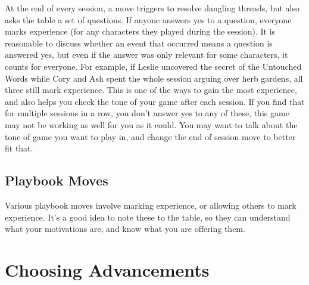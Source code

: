 \documentclass[
  oneside,
  statementpaper,
  9pt]{memoir}
\begin{document}
\begin{Player}

At the end of every session, a move triggers to resolve dangling threads, but also asks the table a set of questions. If anyone answers yes to a question, everyone marks experience (for any characters they played during the session). It is reasonable to discuss whether an event that occurred means a question is answered yes, but even if the answer was only relevant for some characters, it counts for everyone. For example, if Leslie uncovered the secret of the Untouched Words while Cory and Ash spent the whole session arguing over herb gardens, all three still mark experience. This is one of the ways to gain the most experience, and also helps you check the tone of your game after each session. If you find that for multiple sessions in a row, you don't answer yes to any of these, this game may not be working as well for you as it could. You may want to talk about the tone of game you want to play in, and change the end of session move to better fit that.

\end{Player}

\hypertarget{playbook-moves}{%
\subsection{Playbook Moves}\label{playbook-moves}}

\begin{Player}

Various playbook moves involve marking experience, or allowing others to mark experience. It’s a good idea to note these to the table, so they can understand what your motivations are, and know what you are offering them.

\end{Player}

\hypertarget{choosing-advancements}{%
\section{Choosing Advancements}\label{choosing-advancements}}
\end{document}

